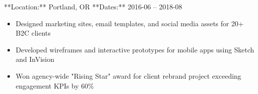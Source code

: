 **Location:** Portland, OR **Dates:** 2016-06 – 2018-08


\begin{itemize}

  \item Designed marketing sites, email templates, and social media assets for 20+ B2C clients

  \item Developed wireframes and interactive prototypes for mobile apps using Sketch and InVision

  \item Won agency-wide "Rising Star" award for client rebrand project exceeding engagement KPIs by 60\%

\end{itemize}



